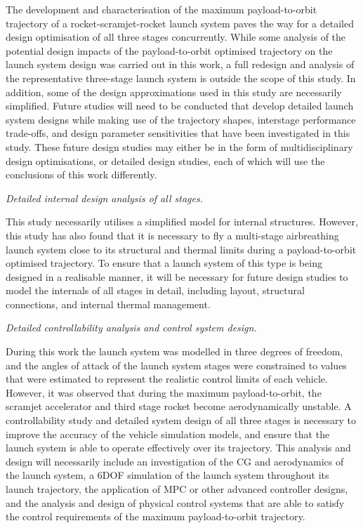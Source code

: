 \noindent
The development and characterisation of the maximum payload-to-orbit trajectory of a rocket-scramjet-rocket launch system paves the way for a detailed design optimisation of all three stages concurrently.
While some analysis of the potential design impacts of the payload-to-orbit optimised trajectory on the launch system design was carried out in this work, a full redesign and analysis of the representative three-stage launch system is outside the scope of this study. In addition, some of the design approximations used in this study are necessarily simplified. Future studies will need to be conducted that develop detailed launch system designs while making use of the trajectory shapes, interstage performance trade-offs, and design parameter sensitivities that have been investigated in this study. These future design studies may either be in the form of multidisciplinary design optimisations, or detailed design studies, each of which will use the conclusions of this work differently. 

\vspace{10pt}
\textit{Detailed internal design analysis of all stages.}

\noindent
This study necessarily utilises a simplified model for internal structures. However, this study has also found that it is necessary to fly a multi-stage airbreathing launch system close to its structural and thermal limits during a payload-to-orbit optimised trajectory. To ensure that a launch system of this type is being designed in a realisable manner, it will be necessary for future design studies to model the internals of all stages in detail, including layout, structural connections, and internal thermal management.  

\vspace{10pt}
	\textit{Detailed controllability analysis and control system design.}

\noindent
During this work the launch system was modelled in three degrees of freedom, and the angles of attack of the launch system stages were constrained to values that were estimated to represent the realistic control limits of each vehicle. However, it was observed that during the maximum payload-to-orbit, the scramjet accelerator and third stage rocket become aerodynamically unstable.
A controllability study and detailed system design of all three stages is necessary to improve the accuracy of the vehicle simulation models, and ensure that the launch system is able to operate effectively over its trajectory. This analysis and design will necessarily include an investigation of the CG and aerodynamics of the launch system, a 6DOF simulation of the launch system throughout its launch trajectory, the application of MPC or other advanced controller designs, and the analysis and design of physical control systems that are able to satisfy the control requirements of the maximum payload-to-orbit trajectory. 


